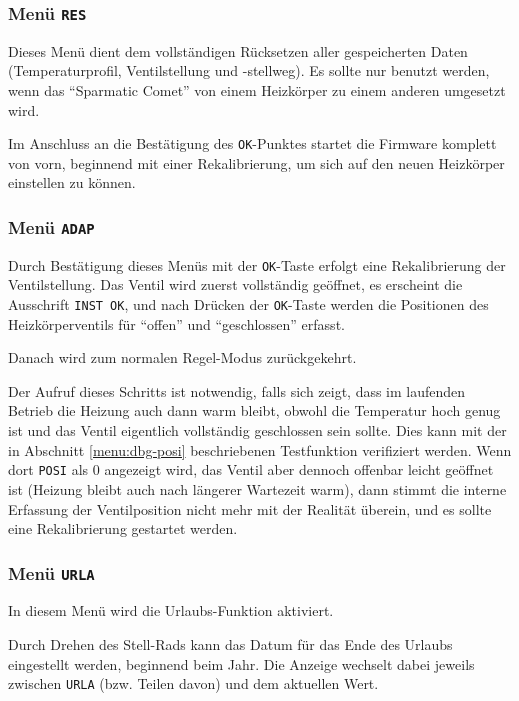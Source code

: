 \documentclass[a5paper,twoside]{article}
\newcommand\SC{"`Sparmatic Comet"'}
\begin{document}
\subsubsection {
  Menü \texttt{RES}\label{menu:res}
}

Dieses Menü dient dem vollständigen Rücksetzen aller gespeicherten
Daten (Temperaturprofil, Ventilstellung und -stellweg).  Es sollte nur
benutzt werden, wenn das \SC{} von einem Heizkörper zu einem anderen
umgesetzt wird.

Im Anschluss an die Bestätigung des \texttt{OK}-Punktes startet die
Firmware komplett von vorn, beginnend mit einer Rekalibrierung, um
sich auf den neuen Heizkörper einstellen zu können.

\subsubsection {
  Menü \texttt{ADAP}
}

Durch Bestätigung dieses Menüs mit der \texttt{OK}-Taste erfolgt
eine Rekalibrierung der Ventilstellung.  Das Ventil wird zuerst
vollständig geöffnet, es erscheint die Ausschrift \texttt{INST OK},
und nach Drücken der \texttt{OK}-Taste werden die Positionen des
Heizkörperventils für "`offen"' und "`geschlossen"' erfasst.

Danach wird zum normalen Regel-Modus zurückgekehrt.

Der Aufruf dieses Schritts ist notwendig, falls sich zeigt, dass im
laufenden Betrieb die Heizung auch dann warm bleibt, obwohl die
Temperatur hoch genug ist und das Ventil eigentlich vollständig
geschlossen sein sollte.  Dies kann mit der in Abschnitt
\ref{menu:dbg-posi} beschriebenen Testfunktion verifiziert werden.
Wenn dort \texttt{POSI} als 0 angezeigt wird, das Ventil aber dennoch
offenbar leicht geöffnet ist (Heizung bleibt auch nach längerer
Wartezeit warm), dann stimmt die interne Erfassung der Ventilposition
nicht mehr mit der Realität überein, und es sollte eine Rekalibrierung
gestartet werden.

\subsubsection {
  Menü \texttt{URLA}
}

In diesem Menü wird die Urlaubs-Funktion aktiviert.

Durch Drehen des Stell-Rads kann das Datum für das Ende des Urlaubs
eingestellt werden, beginnend beim Jahr.  Die Anzeige wechselt dabei
jeweils zwischen \texttt{URLA} (bzw. Teilen davon) und dem aktuellen
Wert.
\end{document}
